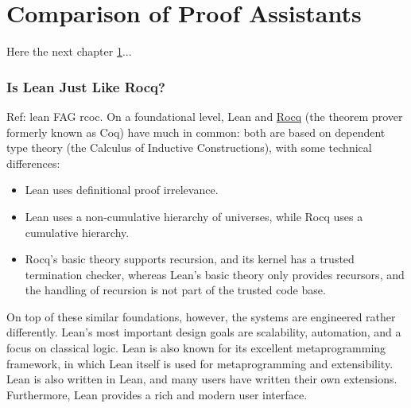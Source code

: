 

\chapter{Comparison of Proof Assistants}
\label{c:chapter6}

Here the next chapter \ref{c:chapter6}...

\subsection{Is Lean Just Like Rocq?}

Ref: lean FAG rcoc. 
On a foundational level, Lean and \href{https://rocq-prover.org/}{Rocq} 
(the theorem prover formerly known as Coq) have much in common: both 
are based on dependent type theory (the Calculus of Inductive 
Constructions), with some technical differences:

\begin{itemize}
    \item Lean uses definitional proof irrelevance.
    \item Lean uses a non-cumulative hierarchy of universes, while 
    Rocq uses a cumulative hierarchy.
    \item Rocq's basic theory supports recursion, and its kernel has 
    a trusted termination checker, whereas Lean's basic theory only 
    provides recursors, and the handling of recursion is not part 
    of the trusted code base.
\end{itemize}

On top of these similar foundations, however, the systems are 
engineered rather differently. Lean's most important design goals 
are scalability, automation, and a focus on classical logic. Lean 
is also known for its excellent metaprogramming framework, in which 
Lean itself is used for metaprogramming and extensibility. Lean is 
also written in Lean, and many users have written their own 
extensions. Furthermore, Lean provides a rich and modern user 
interface.